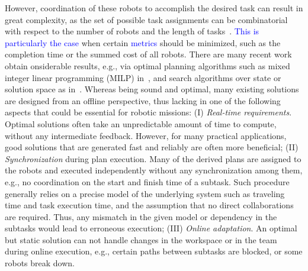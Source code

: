 However, coordination of these robots to accomplish the desired task can result in great complexity,
as the set of possible task assignments can be combinatorial with respect to the number of robots
and the length of tasks~\citep{toth2002overview, LAVAEI2022110617}.
\textcolor{blue}{This is particularly the case} when certain \textcolor{blue}{metrics} should be minimized,
such as the completion time or the summed cost of all robots.
There are many recent work obtain onsiderable results, e.g.,
via optimal planning algorithms
such as mixed integer linear programming (MILP) in~\citep{luo2021temporal,
 sahin2019multirobot, jones2019scratchs},
and search algorithms over state or solution space as
in~\citep{kantaros2020stylus, schillinger2018simultaneous, luo2021abstraction}.
Whereas being sound and optimal,
many existing solutions are designed from an offline perspective,
thus lacking in one of the following aspects that could be essential for robotic missions:
(I) \emph{Real-time requirements}.
Optimal solutions often take an unpredictable amount of time to compute,
without any intermediate feedback.
However, for many practical applications,
good solutions that are generated fast and reliably are often more beneficial;
(II) \emph{Synchronization} during plan execution.
Many of the derived plans are assigned to the robots
and executed independently without any synchronization among them,
e.g., no coordination on the start and finish time of a subtask.
Such procedure generally relies on a precise model of the underlying system
such as traveling time and task execution time,
and the assumption that no direct collaborations are required.
Thus, any mismatch in the given model or dependency in the subtasks would lead to erroneous execution;
(III) \emph{Online adaptation}.
An optimal but static solution can not handle changes in the workspace or in the team during
online execution, e.g., certain paths between subtasks are blocked, or some robots break down.


